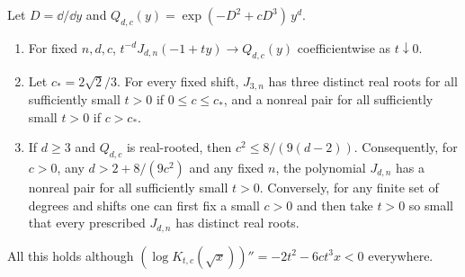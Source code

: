 \begin{theorem}\label{hec:thm:sexticlimit}
Let $D=\dd/\dd y$ and $Q_{d,c}(y)=\exp(-D^2+cD^3)\,y^d$.
\begin{enumerate}[label=\textup{(\roman*)}]
\item For fixed $n,d,c$, $t^{-d}J_{d,n}(-1+ty)\to Q_{d,c}(y)$ coefficientwise as $t\downarrow0$.
\item Let $c_*=2\sqrt2/3$. For every fixed shift, $J_{3,n}$ has three distinct real roots for all
sufficiently small $t>0$ if $0\le c\le c_*$, and a nonreal pair for all sufficiently small $t>0$ if
$c>c_*$.
\item If $d\ge3$ and $Q_{d,c}$ is real-rooted, then $c^2\le8/(9(d-2))$. Consequently, for $c>0$, any
$d>2+8/(9c^2)$ and any fixed $n$, the polynomial $J_{d,n}$ has a nonreal pair for all sufficiently small
$t>0$. Conversely, for any finite set of degrees and shifts one can first fix a small $c>0$ and then take
$t>0$ so small that every prescribed $J_{d,n}$ has distinct real roots.
\end{enumerate}
All this holds although $(\log K_{t,c}(\sqrt x))''=-2t^2-6ct^3x<0$ everywhere.
\end{theorem}

